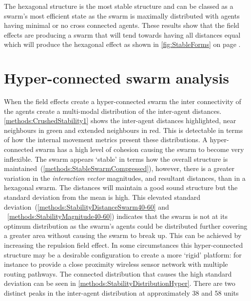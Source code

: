 The hexagonal structure is the most stable structure \cite{HT:2001} and can be classed as a swarm's most efficient state as the swarm is maximally distributed with agents having minimal or no cross connected agents. These results show that the field effects are producing a swarm that will tend towards having all distances equal which will produce the hexagonal effect as shown in \autoref{fig:StableForms} on page \pageref{fig:StableForms}.

\section{Hyper-connected swarm analysis}\label{section:AnalysisB}
When the field effects create a hyper-connected swarm the inter connectivity of the agents create a multi-modal distribution of the inter-agent distances. \autoref{methods:CrushedStability1} shows the inter-agent distances highlighted, near neighbours in green and extended neighbours in red. This is detectable in terms of how the internal movement metrics present these distributions. A hyper-connected swarm has a high level of cohesion causing the swarm to become very inflexible. The swarm appears `stable' in terms how the overall structure is maintained~(\autoref{methods:StableSwarmCompressed}), however, there is a greater variation in the \textit{interaction vector} magnitudes, and resultant distances, than in a hexagonal swarm. The distances will maintain a good sound structure but the standard deviation from the mean is high. This elevated standard deviation~(\autoref{methods:StabilityDistanceSwarm40-60} and ~\ref{methods:StabilityMagnitude40-60}) indicates that the swarm is not at its optimum distribution as the swarm's agents could be distributed further covering a greater area without causing the swarm to break up. This can be achieved by increasing the repulsion field effect. In some circumstances this hyper-connected structure may be a desirable configuration to create a more `rigid' platform: for instance to provide a close proximity wireless sensor network with multiple routing pathways. The connected distribution that causes the high standard deviation can be seen in \autoref{methods:StabilityDistributionHyper}. There are two distinct peaks in the inter-agent distribution at approximately 38 and 58 units

